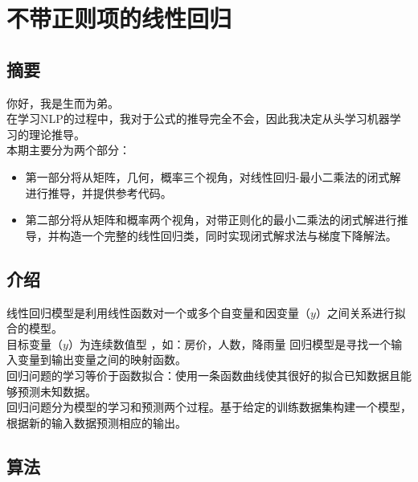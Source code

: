 \documentclass{report}
\begin{document}
\section{不带正则项的线性回归}
\subsection{摘要}
你好，我是生而为弟。\\
在学习NLP的过程中，我对于公式的推导完全不会，因此我决定从头学习机器学习的理论推导。\\
本期主要分为两个部分：
\begin{itemize}
	\item[] 第一部分将从矩阵，几何，概率三个视角，对线性回归-最小二乘法的闭式解进行推导，并提供参考代码。
	\item[] 第二部分将从矩阵和概率两个视角，对带正则化的最小二乘法的闭式解进行推导，并构造一个完整的线性回归类，同时实现闭式解求法与梯度下降解法。
\end{itemize}
\subsection{介绍}
线性回归模型是利用线性函数对一个或多个自变量和因变量（$y$）之间关系进行拟合的模型。\\
目标变量（$y$）为连续数值型 ，如：房价，人数，降雨量 回归模型是寻找一个输入变量到输出变量之间的映射函数。\\
回归问题的学习等价于函数拟合：使用一条函数曲线使其很好的拟合已知数据且能够预测未知数据。\\
回归问题分为模型的学习和预测两个过程。基于给定的训练数据集构建一个模型，根据新的输入数据预测相应的输出。
\subsection{算法}
\end{document}
